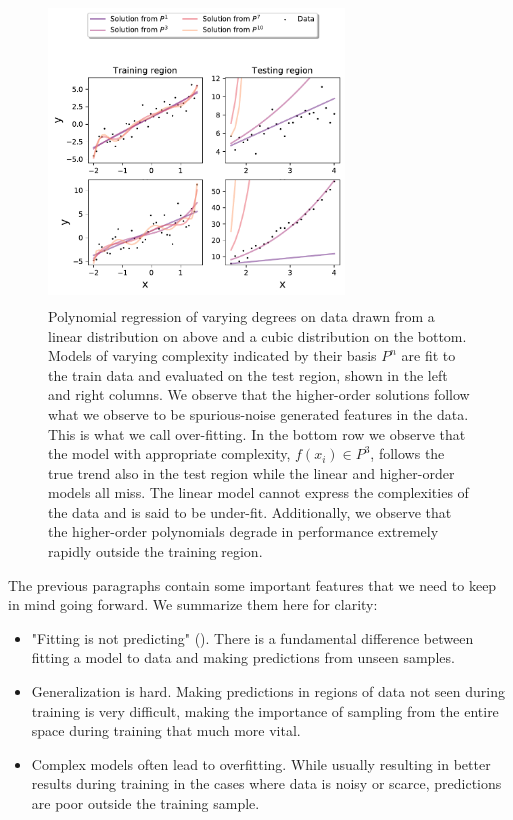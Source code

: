 \begin{figure}
\centering
\includegraphics[width=0.7\textwidth, height=8cm]{../figures/y_distr.pdf}
\caption[Illustrating over-fitting with polynomial regression]{Polynomial regression of varying degrees on data drawn from a linear distribution on above and a cubic distribution on the bottom. Models of varying complexity indicated by their basis $P^n$ are fit to the train data and evaluated on the test region, shown in the left and right columns. We observe that the higher-order solutions follow what we observe to be spurious-noise generated features in the data. This is what we call over-fitting. In the bottom row we observe that the model with appropriate complexity, $f(x_i) \in P^3$, follows the true trend also in the test region while the linear and higher-order models all miss. The linear model cannot express the complexities of the data and is said to be under-fit. Additionally, we observe that the higher-order polynomials degrade in performance extremely rapidly outside the training region.}\label{fig:overfit}
\end{figure}

The previous paragraphs contain some important features that we need to keep in mind going forward. We summarize them here for clarity: 
\begin{itemize}
\item "Fitting is not predicting" (\cite{Mehta2019}). There is a fundamental difference between fitting a model to data and making predictions from unseen samples. \\
\item Generalization is hard. Making predictions in regions of data not seen during training is very difficult, making the importance of sampling from the entire space during training that much more vital. \\
\item Complex models often lead to overfitting. While usually resulting in better results during training in the cases where data is noisy or scarce, predictions are poor outside the training sample. 
\end{itemize}



